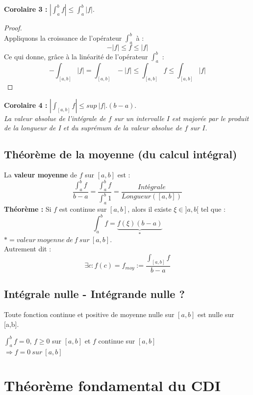\documentclass	[11pt, a4paper, openany]{book}
\begin{document}
\textbf{Corolaire 3 :} $|\int_a^b f| \leq \int_a^b |f|$.

\begin{proof}\ \\
Appliquons la croissance de l'opérateur $\int_a^b$ à :
$$-|f| \leq f \leq |f|$$
Ce qui donne, grâce à la linéarité de l'opérateur $\int_a^b$ :
$$- \int_{[a,b]} |f| = \int_{[a,b]} -|f| \leq \int_{[a,b]} f \leq \int_{[a,b]} |f|$$
\end{proof}

\textbf{Corolaire 4 :} $|\int_{[a,b]} f| \leq sup\ |f|.(b-a)$. \\
\textit{La valeur absolue de l'intégrale de $f$ sur un intervalle $I$ est majorée par le produit de la longueur de I et du suprémum de la valeur absolue de $f$ sur $I$.}

\subsection{Théorème de la moyenne (du calcul intégral)}
La \textbf{valeur moyenne} de $f$ sur $[a,b]$ est  :
$$\frac{\int_a^b f}{b-a} = \frac{\int_a^b f}{\int_a^b 1} = \frac{Intégrale}{Longueur([a,b])}$$
\textbf{Théorème :} Si $f$ est continue sur $[a,b]$, alors il existe $\xi \in ]a,b[$ tel que :
$$\int_a^b f = \underbrace{f(\xi)(b-a)}_{*}$$
$* = valeur\ moyenne\ de\ f\ sur\ [a,b]$.\\
Autrement dit : 
$$\exists c : f(c) = f_{moy} := \frac{\int_{[a,b]} f}{b-a}$$

\subsection{Intégrale nulle - Intégrande nulle ?}
Toute fonction continue et positive de moyenne nulle sur $[a,b]$ est nulle sur [a,b].
\begin{center}
$\int_a^b f = 0$, $f \geq 0$ sur $[a,b]$ et $f$ continue sur $[a,b]$\\
$\Rightarrow f = 0\ sur\ [a,b]$

\end{center}

\section{Théorème fondamental du CDI}
\end{document}
